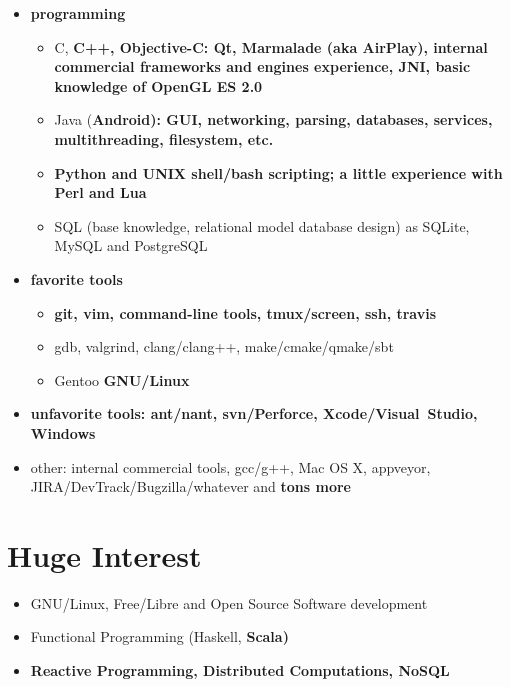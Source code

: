 \begin{itemize}

\item \bfseries programming\mdseries

    \begin{itemize}
    \item C, \bfseries C++\mdseries, Objective-C:
    Qt, Marmalade (aka AirPlay), internal commercial frameworks and engines experience,
    \bfseries JNI\mdseries, basic knowledge of OpenGL ES 2.0


    \item Java (\bfseries Android\mdseries):
    GUI, networking, parsing, databases, services, multithreading, filesystem, etc.


    \item \bfseries Python \mdseries and UNIX \bfseries shell/bash \mdseries scripting;
    a little experience with Perl and Lua

    \item SQL (base knowledge, relational model database design) as SQLite, MySQL and PostgreSQL
    \end{itemize}

\item \bfseries favorite \mdseries tools
    \begin{itemize}
    \item\bfseries git\mdseries, vim, command-line tools, tmux/screen, \bfseries ssh\mdseries, travis
    \item gdb, valgrind, clang/clang++, make/cmake/qmake/sbt
    \item Gentoo \bfseries GNU/Linux\mdseries
    \end{itemize}
\item \bfseries un\mdseries favorite tools: ant/nant, svn/Perforce, Xcode/Visual~Studio, Windows
\item other: internal commercial tools, gcc/g++, Mac OS X, appveyor, JIRA/DevTrack/Bugzilla/whatever and \bfseries tons \mdseries more

\end{itemize}

\section{Huge Interest}
\begin{itemize}
\item GNU/Linux, Free/Libre and Open Source Software development
\item Functional Programming (Haskell, \bfseries Scala\mdseries)
\item \bfseries Reactive \mdseries Programming, \bfseries Distributed \mdseries Computations, NoSQL
\end{itemize}

